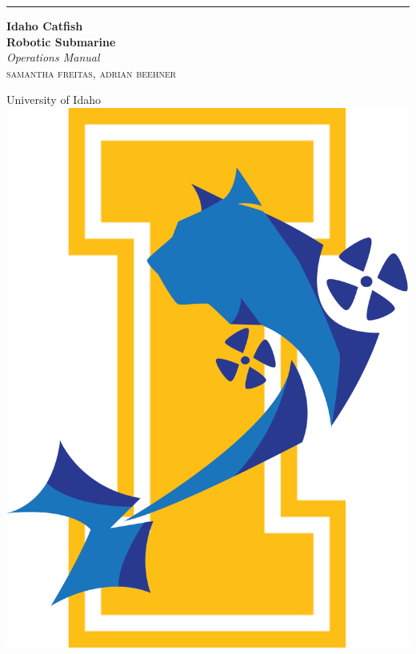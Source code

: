 \documentclass[a4paper, 11pt]{book} %
\begin{document}

\begin{titlepage} %
	
	\raggedleft %
	
	\rule{1pt}{\textheight} %
	\hspace{0.05\textwidth} %
	\parbox[b]{0.75\textwidth}{ %
		
		{\Huge\bfseries Idaho Catfish
			 \\[0.5\baselineskip] Robotic Submarine}\\[2\baselineskip] %
		{\large\textit{Operations
		 Manual}}\\[4\baselineskip] %
		{\Large\textsc{samantha freitas, adrian beehner}} %
		
		\vspace{0.5\textheight} %
		
		{\noindent University of Idaho~~
			\includegraphics[width=0.08\linewidth]{Assets/Logos/New_Logov1.png}}\\[\baselineskip] %
	}

\end{titlepage}

\end{document}
